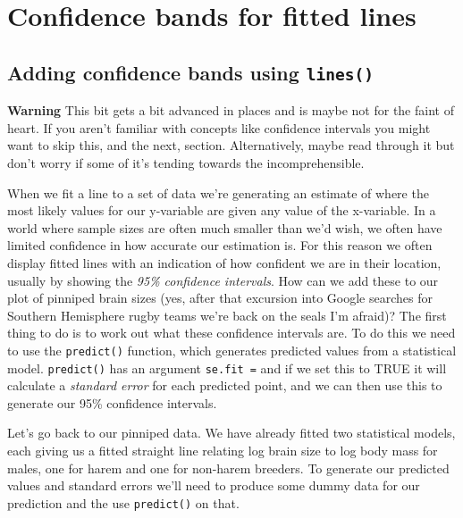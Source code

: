 \documentclass[
]{book}
\begin{document}
\hypertarget{confidence-bands-for-fitted-lines}{%
\section{Confidence bands for fitted lines}\label{confidence-bands-for-fitted-lines}}

\hypertarget{adding-confidence-bands-using-lines}{%
\subsection{\texorpdfstring{Adding confidence bands using \texttt{lines()}}{Adding confidence bands using lines()}}\label{adding-confidence-bands-using-lines}}

\textbf{Warning} This bit gets a bit advanced in places and is maybe not for the faint of heart. If you aren't familiar with concepts like confidence intervals you might want to skip this, and the next, section. Alternatively, maybe read through it but don't worry if some of it's tending towards the incomprehensible.

When we fit a line to a set of data we're generating an estimate of where the most likely values for our y-variable are given any value of the x-variable. In a world where sample sizes are often much smaller than we'd wish, we often have limited confidence in how accurate our estimation is. For this reason we often display fitted lines with an indication of how confident we are in their location, usually by showing the \emph{95\% confidence intervals}. How can we add these to our plot of pinniped brain sizes (yes, after that excursion into Google searches for Southern Hemisphere rugby teams we're back on the seals I'm afraid)? The first thing to do is to work out what these confidence intervals are. To do this we need to use the \texttt{predict()} function, which generates predicted values from a statistical model. \texttt{predict()} has an argument \texttt{se.fit\ =} and if we set this to TRUE it will calculate a \emph{standard error} for each predicted point, and we can then use this to generate our 95\% confidence intervals.

Let's go back to our pinniped data. We have already fitted two statistical models, each giving us a fitted straight line relating log brain size to log body mass for males, one for harem and one for non-harem breeders. To generate our predicted values and standard errors we'll need to produce some dummy data for our prediction and the use \texttt{predict()} on that.
\end{document}
